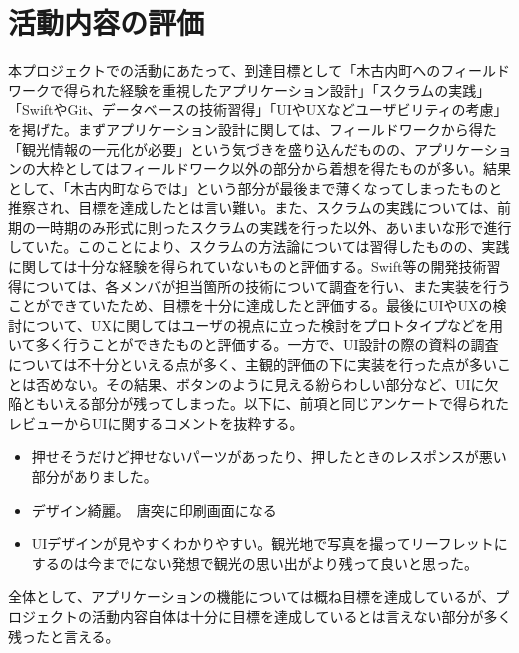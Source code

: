 \section{活動内容の評価}
本プロジェクトでの活動にあたって、到達目標として「木古内町へのフィールドワークで得られた経験を重視したアプリケーション設計」「スクラムの実践」「SwiftやGit、データベースの技術習得」「UIやUXなどユーザビリティの考慮」を掲げた。まずアプリケーション設計に関しては、フィールドワークから得た「観光情報の一元化が必要」という気づきを盛り込んだものの、アプリケーションの大枠としてはフィールドワーク以外の部分から着想を得たものが多い。結果として、「木古内町ならでは」という部分が最後まで薄くなってしまったものと推察され、目標を達成したとは言い難い。また、スクラムの実践については、前期の一時期のみ形式に則ったスクラムの実践を行った以外、あいまいな形で進行していた。このことにより、スクラムの方法論については習得したものの、実践に関しては十分な経験を得られていないものと評価する。Swift等の開発技術習得については、各メンバが担当箇所の技術について調査を行い、また実装を行うことができていたため、目標を十分に達成したと評価する。最後にUIやUXの検討について、UXに関してはユーザの視点に立った検討をプロトタイプなどを用いて多く行うことができたものと評価する。一方で、UI設計の際の資料の調査については不十分といえる点が多く、主観的評価の下に実装を行った点が多いことは否めない。その結果、ボタンのように見える紛らわしい部分など、UIに欠陥ともいえる部分が残ってしまった。以下に、前項と同じアンケートで得られたレビューからUIに関するコメントを抜粋する。
\begin{itemize}
\item 押せそうだけど押せないパーツがあったり、押したときのレスポンスが悪い部分がありました。
\item デザイン綺麗。　唐突に印刷画面になる
\item UIデザインが見やすくわかりやすい。観光地で写真を撮ってリーフレットにするのは今までにない発想で観光の思い出がより残って良いと思った。
\end{itemize}
全体として、アプリケーションの機能については概ね目標を達成しているが、プロジェクトの活動内容自体は十分に目標を達成しているとは言えない部分が多く残ったと言える。

